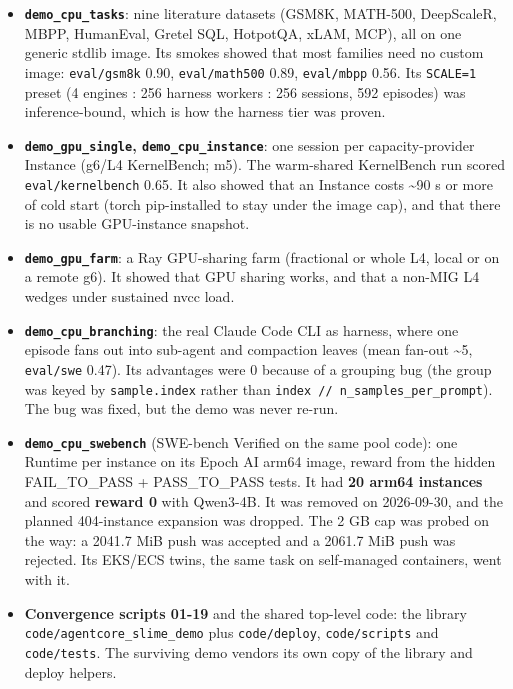 \documentclass[
  paper=a4,
  ,captions=tableheading
]{scrartcl}
\providecommand{\tightlist}{%
  \setlength{\itemsep}{0pt}\setlength{\parskip}{0pt}}
\begin{document}
\begin{itemize}
\tightlist
\item
  \textbf{\texttt{demo\_cpu\_tasks}}: nine literature datasets (GSM8K,
  MATH-500, DeepScaleR, MBPP, HumanEval, Gretel SQL, HotpotQA, xLAM,
  MCP), all on one generic stdlib image. Its smokes showed that most
  families need no custom image: \texttt{eval/gsm8k} 0.90,
  \texttt{eval/math500} 0.89, \texttt{eval/mbpp} 0.56. Its
  \texttt{SCALE=1} preset (4 engines : 256 harness workers : 256
  sessions, 592 episodes) was inference-bound, which is how the harness
  tier was proven.
\item
  \textbf{\texttt{demo\_gpu\_single}, \texttt{demo\_cpu\_instance}}: one
  session per capacity-provider Instance (g6/L4 KernelBench; m5). The
  warm-shared KernelBench run scored \texttt{eval/kernelbench} 0.65. It
  also showed that an Instance costs \textasciitilde90 s or more of cold
  start (torch pip-installed to stay under the image cap), and that
  there is no usable GPU-instance snapshot.
\item
  \textbf{\texttt{demo\_gpu\_farm}}: a Ray GPU-sharing farm (fractional
  or whole L4, local or on a remote g6). It showed that GPU sharing
  works, and that a non-MIG L4 wedges under sustained nvcc load.
\item
  \textbf{\texttt{demo\_cpu\_branching}}: the real Claude Code CLI as
  harness, where one episode fans out into sub-agent and compaction
  leaves (mean fan-out \textasciitilde5, \texttt{eval/swe} 0.47). Its
  advantages were 0 because of a grouping bug (the group was keyed by
  \texttt{sample.index} rather than
  \texttt{index\ //\ n\_samples\_per\_prompt}). The bug was fixed, but
  the demo was never re-run.
\item
  \textbf{\texttt{demo\_cpu\_swebench}} (SWE-bench Verified on the same
  pool code): one Runtime per instance on its Epoch AI arm64 image,
  reward from the hidden FAIL\_TO\_PASS + PASS\_TO\_PASS tests. It had
  \textbf{20 arm64 instances} and scored \textbf{reward 0} with
  Qwen3-4B. It was removed on 2026-09-30, and the planned 404-instance
  expansion was dropped. The 2 GB cap was probed on the way: a 2041.7
  MiB push was accepted and a 2061.7 MiB push was rejected. Its EKS/ECS
  twins, the same task on self-managed containers, went with it.
\item
  \textbf{Convergence scripts 01-19} and the shared top-level code: the
  library \texttt{code/agentcore\_slime\_demo} plus
  \texttt{code/deploy}, \texttt{code/scripts} and \texttt{code/tests}.
  The surviving demo vendors its own copy of the library and deploy
  helpers.
\end{itemize}
\end{document}
